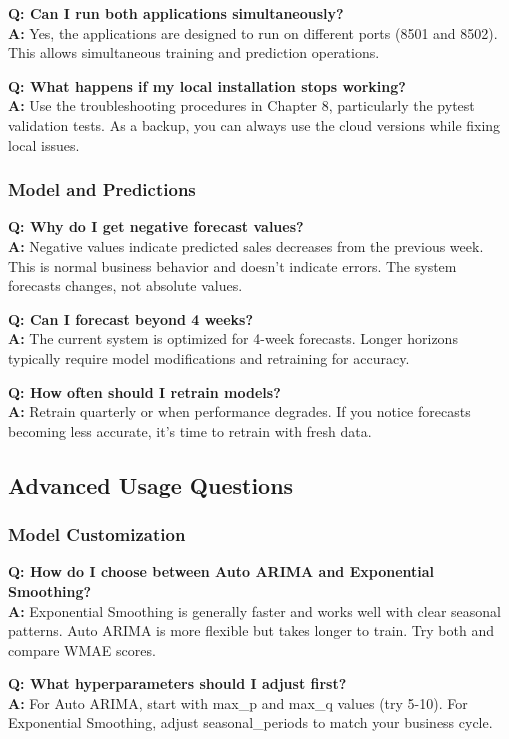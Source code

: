 \textbf{Q: Can I run both applications simultaneously?}\\
\textbf{A:} Yes, the applications are designed to run on different ports (8501 and 8502). This allows simultaneous training and prediction operations.

\textbf{Q: What happens if my local installation stops working?}\\
\textbf{A:} Use the troubleshooting procedures in Chapter 8, particularly the pytest validation tests. As a backup, you can always use the cloud versions while fixing local issues.

\subsubsection{Model and Predictions}

\textbf{Q: Why do I get negative forecast values?}\\
\textbf{A:} Negative values indicate predicted sales decreases from the previous week. This is normal business behavior and doesn't indicate errors. The system forecasts changes, not absolute values.

\textbf{Q: Can I forecast beyond 4 weeks?}\\
\textbf{A:} The current system is optimized for 4-week forecasts. Longer horizons typically require model modifications and retraining for accuracy.

\textbf{Q: How often should I retrain models?}\\
\textbf{A:} Retrain quarterly or when performance degrades. If you notice forecasts becoming less accurate, it's time to retrain with fresh data.

\subsection{Advanced Usage Questions}

\subsubsection{Model Customization}

\textbf{Q: How do I choose between Auto ARIMA and Exponential Smoothing?}\\
\textbf{A:} Exponential Smoothing is generally faster and works well with clear seasonal patterns. Auto ARIMA is more flexible but takes longer to train. Try both and compare WMAE scores.

\textbf{Q: What hyperparameters should I adjust first?}\\
\textbf{A:} For Auto ARIMA, start with max\_p and max\_q values (try 5-10). For Exponential Smoothing, adjust seasonal\_periods to match your business cycle.


